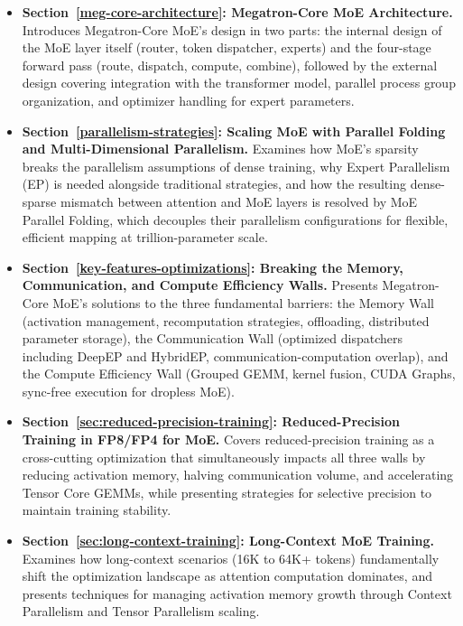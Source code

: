 \documentclass[10pt,logo,copyright]{nvidiatechreport}
\begin{document}
\begin{itemize}

\item \textbf{Section~\ref{meg-core-architecture}: Megatron-Core MoE Architecture.}
Introduces Megatron-Core MoE's design in two parts: the internal design of the MoE layer itself (router, token dispatcher, experts) and the four-stage forward pass (route, dispatch, compute, combine), followed by the external design covering integration with the transformer model, parallel process group organization, and optimizer handling for expert parameters.

\item \textbf{Section~\ref{parallelism-strategies}: Scaling MoE with Parallel Folding and Multi-Dimensional Parallelism.}
Examines how MoE's sparsity breaks the parallelism assumptions of dense training, why Expert Parallelism (EP) is needed alongside traditional strategies, and how the resulting dense-sparse mismatch between attention and MoE layers is resolved by MoE Parallel Folding, which decouples their parallelism configurations for flexible, efficient mapping at trillion-parameter scale.

\item \textbf{Section~\ref{key-features-optimizations}: Breaking the Memory, Communication, and Compute Efficiency Walls.}
Presents Megatron-Core MoE's solutions to the three fundamental barriers: the Memory Wall (activation management, recomputation strategies, offloading, distributed parameter storage), the Communication Wall (optimized dispatchers including DeepEP and HybridEP, communication-computation overlap), and the Compute Efficiency Wall (Grouped GEMM, kernel fusion, CUDA Graphs, sync-free execution for dropless MoE).

\item \textbf{Section~\ref{sec:reduced-precision-training}: Reduced-Precision Training in FP8/FP4 for MoE.}
Covers reduced-precision training as a cross-cutting optimization that simultaneously impacts all three walls by reducing activation memory, halving communication volume, and accelerating Tensor Core GEMMs, while presenting strategies for selective precision to maintain training stability.

\item \textbf{Section~\ref{sec:long-context-training}: Long-Context MoE Training.}
Examines how long-context scenarios (16K to 64K+ tokens) fundamentally shift the optimization landscape as attention computation dominates, and presents techniques for managing activation memory growth through Context Parallelism and Tensor Parallelism scaling.


\end{itemize}
\end{document}
